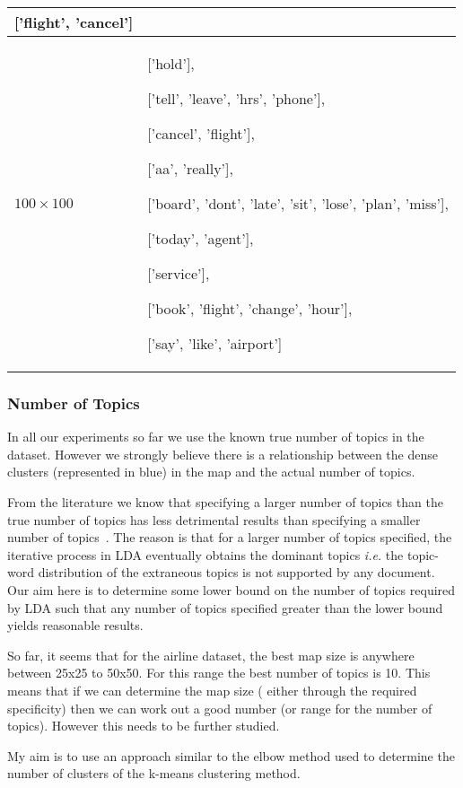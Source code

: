 \documentclass{article}
\begin{document}
\begin{table}[htbp]
\begin{tabular}{|p{1.5cm}|p{10cm}| }
	['flight', 'cancel']\\
	\hline
	$100 \times 100 $& ['hold'],
	 
	['tell', 'leave', 'hrs', 'phone'],
	 
	['cancel', 'flight'], 
	
	['aa', 'really'], 
	
	['board', 'dont', 'late', 'sit', 'lose', 'plan', 'miss'],
	
	['today', 'agent'], 
	
	['service'], 
	
	['book', 'flight', 'change', 'hour'], 
	
	['say', 'like', 'airport']\\
	\hline

	
\end{tabular}
\end{table}

\subsubsection{Number of Topics }

In all our experiments so far we use the known true number of topics in the dataset. However we strongly believe there is a relationship between the dense clusters (represented in blue) in the map and the actual number of topics.

From the literature we know that specifying a larger number of topics than the true number of topics has less detrimental results than specifying a smaller number of topics~\cite{Griffiths04}. The reason is that for a larger number of topics specified, the iterative process in LDA eventually obtains the dominant topics \emph{i.e.} the topic-word distribution of the extraneous topics is not supported by any document. Our aim here is to determine some lower bound on the number of topics required by LDA such that any number of topics specified greater than the lower bound yields reasonable results. 

So far, it seems that for the airline dataset, the best map size is anywhere between 25x25 to 50x50. For this range the best number of topics is 10. This means that if we can determine the map size ( either through the required specificity) then we can work out a good number (or range for the number of topics). However this needs to be further studied.

My aim is to use an approach similar to the elbow method used to determine the number of clusters of the k-means clustering method.
\end{document}
